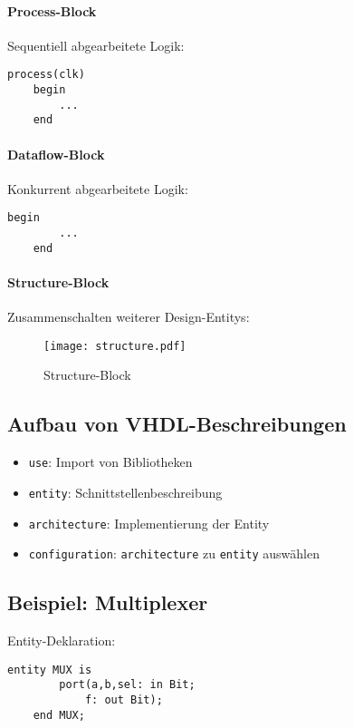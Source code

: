 \paragraph{Process-Block}
Sequentiell abgearbeitete Logik:
\begin{lstlisting}[style=vhdl]
    process(clk)
    begin
        ...
    end
\end{lstlisting}

\paragraph{Dataflow-Block}
Konkurrent abgearbeitete Logik:
\begin{lstlisting}[style=vhdl]
    begin
        ...
    end
\end{lstlisting}

\paragraph{Structure-Block}
Zusammenschalten weiterer Design-Entitys:
\begin{figure}[H]
    \centering
    \texttt{[image: structure.pdf]}
    \caption{Structure-Block}
\end{figure}

\subsection{Aufbau von VHDL-Beschreibungen}
\begin{itemize}
    \item \lstinline[style=vhdl]{use}: Import von Bibliotheken
    \item \lstinline[style=vhdl]{entity}: Schnittstellenbeschreibung
    \item \lstinline[style=vhdl]{architecture}: Implementierung der Entity
    \item \lstinline[style=vhdl]{configuration}: \lstinline[style=vhdl]{architecture} zu \lstinline[style=vhdl]{entity} auswählen
\end{itemize}

\subsection{Beispiel: Multiplexer}
Entity-Deklaration:
\begin{lstlisting}[style=vhdl]
    entity MUX is
        port(a,b,sel: in Bit;
            f: out Bit);
    end MUX;
\end{lstlisting}

